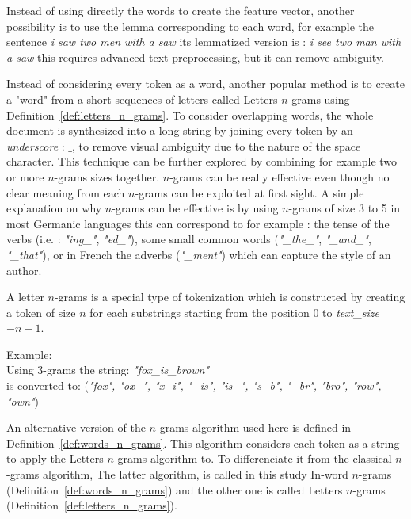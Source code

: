 Instead of using directly the words to create the feature vector, another possibility is to use the lemma corresponding to each word, for example the sentence \textit{i saw two men with a saw} its lemmatized version is : \textit{i see two man with a saw} this requires advanced text preprocessing, but it can remove ambiguity.

Instead of considering every token as a word, another popular method is to create a "word" from a short sequences of letters called Letters $n$-grams using Definition~\ref{def:letters_n_grams}.
To consider overlapping words, the whole document is synthesized into a long string by joining every token by an \textit{underscore} : $\_$, to remove visual ambiguity due to the nature of the space character.
This technique can be further explored by combining for example two or more $n$-grams sizes together.
$n$-grams can be really effective even though no clear meaning from each $n$-grams can be exploited at first sight.
A simple explanation on why $n$-grams can be effective is by using $n$-grams of size 3 to 5 in most Germanic languages this can correspond to for example : the tense of the verbs (i.e. : \textit{"ing\_"}, \textit{"ed\_"}), some small common words (\textit{"\_the\_"}, \textit{"\_and\_"}, \textit{"\_that"}), or in French the adverbs (\textit{"\_ment"}) which can capture the style of an author.

\begin{definition}
  \label{def:letters_n_grams}
  A letter $n$-grams is a special type of tokenization which is constructed by creating a token of size $n$ for each substrings starting from the position $0$ to \textit{text\_size} $- n - 1$.

  Example: \\
  Using 3-grams the string: \textit{"fox\_is\_brown"} \\
  is converted to: (\textit{"fox", "ox\_", "x\_i", "\_is", "is\_", "s\_b", "\_br", "bro", "row", "own"})
\end{definition}

An alternative version of the $n$-grams algorithm used here is defined in Definition~\ref{def:words_n_grams}.
This algorithm considers each token as a string to apply the Letters $n$-grams algorithm to.
To differenciate it from the classical $n$-grams algorithm,
The latter algorithm, is called in this study In-word $n$-grams (Definition~\ref{def:words_n_grams}) and the other one is called Letters $n$-grams (Definition~\ref{def:letters_n_grams}).

